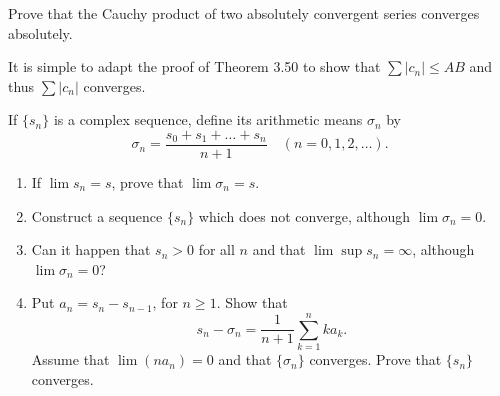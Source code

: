 \setcounter{problem}{12}
\begin{problem}
  Prove that the Cauchy product of two absolutely convergent series converges absolutely.
\end{problem}

\begin{solution}
  It is simple to adapt the proof of Theorem 3.50 to show that $\sum |c_n| \le AB$ and thus $\sum |c_n|$ converges.
\end{solution}

\begin{problem}
  If $\{s_n\}$ is a complex sequence, define its arithmetic means $\sigma_n$ by
  \[\sigma_n = \frac{s_0 + s_1 + \ldots + s_n}{n + 1} \quad (n = 0, 1, 2, \ldots).\]
  \begin{enumerate}[label=(\alph*)]
    \item If $\lim s_n = s$, prove that $\lim \sigma_n = s$.
    \item Construct a sequence $\{s_n\}$ which does not converge, although $\lim \sigma_n = 0$.
    \item Can it happen that $s_n > 0$ for all $n$ and that $\lim\sup s_n = \infty$, although $\lim \sigma_n = 0$?
    \item Put $a_n = s_n - s_{n-1}$, for $n \ge 1$.
      Show that
      \[s_n - \sigma_n = \frac{1}{n + 1} \sum_{k = 1}^{n} k a_k .\]
      Assume that $\lim (na_n) = 0$ and that $\{\sigma_n\}$ converges.
      Prove that $\{s_n\}$ converges.
  \end{enumerate}
\end{problem}

